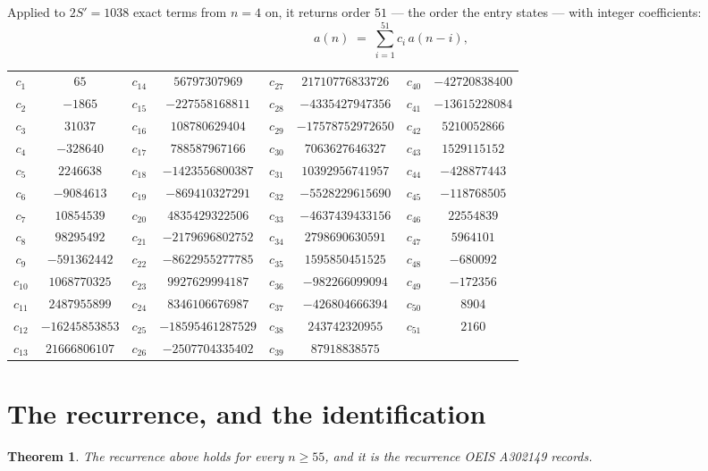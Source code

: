 \documentclass[11pt,a4paper]{article}
\theoremstyle{plain}
\newtheorem{theorem}{Theorem}
\theoremstyle{definition}
\begin{document}
Applied to $2S'=1038$ exact terms from $n=4$ on, it returns order $51$ --- the
order the entry states --- with integer coefficients:
\[
a(n)\;=\;\sum_{i=1}^{51}c_i\,a(n-i),
\]
\begin{center}\small
\begin{tabular}{cccccccc}
$c_{1}$ & $65$ & $c_{14}$ & $56797307969$ & $c_{27}$ & $21710776833726$ & $c_{40}$ & $-42720838400$ \\
$c_{2}$ & $-1865$ & $c_{15}$ & $-227558168811$ & $c_{28}$ & $-4335427947356$ & $c_{41}$ & $-13615228084$ \\
$c_{3}$ & $31037$ & $c_{16}$ & $108780629404$ & $c_{29}$ & $-17578752972650$ & $c_{42}$ & $5210052866$ \\
$c_{4}$ & $-328640$ & $c_{17}$ & $788587967166$ & $c_{30}$ & $7063627646327$ & $c_{43}$ & $1529115152$ \\
$c_{5}$ & $2246638$ & $c_{18}$ & $-1423556800387$ & $c_{31}$ & $10392956741957$ & $c_{44}$ & $-428877443$ \\
$c_{6}$ & $-9084613$ & $c_{19}$ & $-869410327291$ & $c_{32}$ & $-5528229615690$ & $c_{45}$ & $-118768505$ \\
$c_{7}$ & $10854539$ & $c_{20}$ & $4835429322506$ & $c_{33}$ & $-4637439433156$ & $c_{46}$ & $22554839$ \\
$c_{8}$ & $98295492$ & $c_{21}$ & $-2179696802752$ & $c_{34}$ & $2798690630591$ & $c_{47}$ & $5964101$ \\
$c_{9}$ & $-591362442$ & $c_{22}$ & $-8622955277785$ & $c_{35}$ & $1595850451525$ & $c_{48}$ & $-680092$ \\
$c_{10}$ & $1068770325$ & $c_{23}$ & $9927629994187$ & $c_{36}$ & $-982266099094$ & $c_{49}$ & $-172356$ \\
$c_{11}$ & $2487955899$ & $c_{24}$ & $8346106676987$ & $c_{37}$ & $-426804666394$ & $c_{50}$ & $8904$ \\
$c_{12}$ & $-16245853853$ & $c_{25}$ & $-18595461287529$ & $c_{38}$ & $243742320955$ & $c_{51}$ & $2160$ \\
$c_{13}$ & $21666806107$ & $c_{26}$ & $-2507704335402$ & $c_{39}$ & $87918838575$ &  &  \\
\end{tabular}
\end{center}

\section{The recurrence, and the identification}

\begin{theorem}
The recurrence above holds for every $n\ge55$, and it is the recurrence OEIS A302149 records.
\end{theorem}
\end{document}
